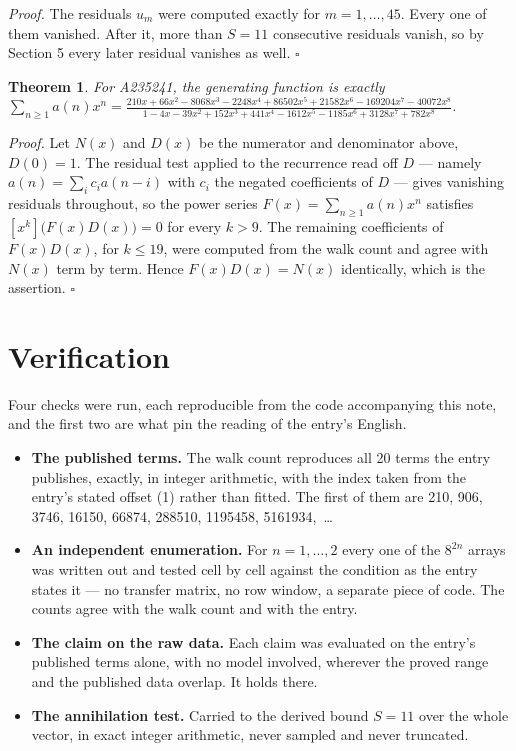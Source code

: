 \documentclass[11pt]{article}
\newtheorem{theorem}{Theorem}
\theoremstyle{definition}
\begin{document}
{\itshape Proof.} The residuals $u_m$ were computed exactly for $m = 1,\dots,45$. Every one of them vanished. After it, more than $S = 11$ consecutive residuals vanish, so by Section 5 every later residual vanishes as well. $\square$

\begin{theorem} For A235241, the generating function is exactly $\sum_{n\ge 1} a(n)x^n = \frac{210x + 66x^{2} - 8068x^{3} - 2248x^{4} + 86502x^{5} + 21582x^{6} - 169204x^{7} - 40072x^{8}}{1 - 4x - 39x^{2} + 152x^{3} + 441x^{4} - 1612x^{5} - 1185x^{6} + 3128x^{7} + 782x^{8}}$.\end{theorem}

{\itshape Proof.} Let $N(x)$ and $D(x)$ be the numerator and denominator above, $D(0)=1$. The residual test applied to the recurrence read off $D$ --- namely $a(n) = \sum_i c_i a(n-i)$ with $c_i$ the negated coefficients of $D$ --- gives vanishing residuals throughout, so the power series $F(x)=\sum_{n\ge 1}a(n)x^n$ satisfies $[x^k]\bigl(F(x)D(x)\bigr) = 0$ for every $k > 9$. The remaining coefficients of $F(x)D(x)$, for $k \le 19$, were computed from the walk count and agree with $N(x)$ term by term. Hence $F(x)D(x) = N(x)$ identically, which is the assertion. $\square$

\section{Verification}

Four checks were run, each reproducible from the code accompanying this note, and the first two are what pin the reading of the entry's English.

\begin{itemize}

\item {\bfseries The published terms.} The walk count reproduces all 20 terms the entry publishes, exactly, in integer arithmetic, with the index taken from the entry's stated offset (1) rather than fitted. The first of them are 210, 906, 3746, 16150, 66874, 288510, 1195458, 5161934,~\dots

\item {\bfseries An independent enumeration.} For $n = 1,\dots,2$ every one of the $8^{2n}$ arrays was written out and tested cell by cell against the condition as the entry states it --- no transfer matrix, no row window, a separate piece of code. The counts agree with the walk count and with the entry.

\item {\bfseries The claim on the raw data.} Each claim was evaluated on the entry's published terms alone, with no model involved, wherever the proved range and the published data overlap. It holds there.

\item {\bfseries The annihilation test.} Carried to the derived bound $S = 11$ over the whole vector, in exact integer arithmetic, never sampled and never truncated.

\end{itemize}
\end{document}
